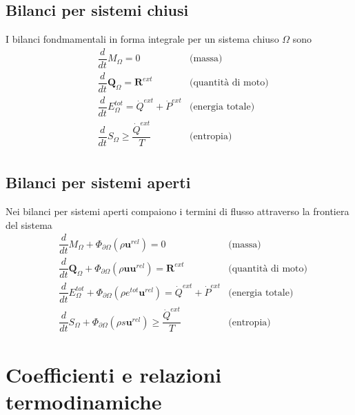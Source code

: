 \section{Bilanci per sistemi chiusi}
I bilanci fondmamentali in forma integrale per un sistema chiuso $\Omega$ sono
\begin{equation}
\begin{aligned}
    & \dfrac{d}{dt}{M}_{\Omega} = 0 & \text{(massa)} \\
    & \dfrac{d}{dt}{\mathbf{Q}}_{\Omega} = \mathbf{R}^{ext} & \text{(quantità di moto)} \\
    & \dfrac{d}{dt}{E}^{tot}_{\Omega} = \dot{Q}^{ext} + \dot{P}^{ext} & \text{(energia totale)} \\
    & \dfrac{d}{dt}{S}_{\Omega} \ge \dfrac{\dot{Q}^{ext}}{T} & \text{(entropia)} \\
\end{aligned}
\end{equation}

\section{Bilanci per sistemi aperti}
Nei bilanci per sistemi aperti compaiono i termini di flusso attraverso la frontiera del sistema
\begin{equation}
\begin{aligned}
    & \dfrac{d}{dt}{M}_{\Omega} + \Phi_{\partial \Omega}(\rho \mathbf{u}^{rel}) = 0 & \text{(massa)} \\
    & \dfrac{d}{dt}{\mathbf{Q}}_{\Omega} + \Phi_{\partial \Omega}(\rho \mathbf{u} \mathbf{u}^{rel}) = \mathbf{R}^{ext} & \text{(quantità di moto)} \\
    & \dfrac{d}{dt}{E}^{tot}_{\Omega} + \Phi_{\partial \Omega}(\rho e^{tot} \mathbf{u}^{rel}) = \dot{Q}^{ext} + \dot{P}^{ext} & \text{(energia totale)} \\
    & \dfrac{d}{dt}{S}_{\Omega} + \Phi_{\partial \Omega}(\rho s \mathbf{u}^{rel}) \ge \dfrac{\dot{Q}^{ext}}{T} & \text{(entropia)}
\end{aligned}
\end{equation}


\chapter{Coefficienti e relazioni termodinamiche}


